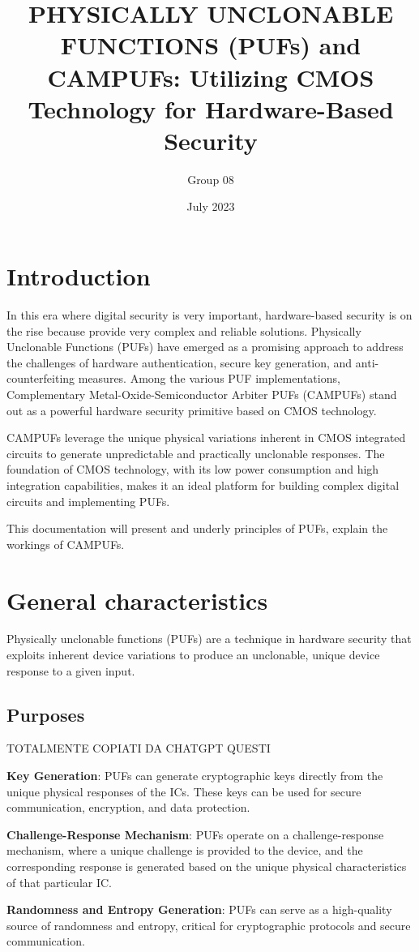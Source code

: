 \documentclass{article}
\title{\textbf{PHYSICALLY UNCLONABLE FUNCTIONS (PUFs) and CAMPUFs: Utilizing CMOS Technology for Hardware-Based Security}}
\author{ Group 08 } %
\date{July 2023}
\begin{document}
\maketitle
\section{Introduction}
In this era where digital security is very important, hardware-based security  is on the rise because provide very complex and reliable solutions. Physically Unclonable Functions (PUFs) have emerged as a promising approach to address the challenges of hardware authentication, secure key generation, and anti-counterfeiting measures. Among the various PUF implementations, Complementary Metal-Oxide-Semiconductor Arbiter PUFs (CAMPUFs) stand out as a powerful hardware security primitive based on CMOS technology.

CAMPUFs leverage the unique physical variations inherent in CMOS integrated circuits to generate unpredictable and practically unclonable responses. The foundation of CMOS technology, with its low power consumption and high integration capabilities, makes it an ideal platform for building complex digital circuits and implementing PUFs.

This documentation will present and underly principles of PUFs, explain the workings of CAMPUFs.
\section{General characteristics}
Physically unclonable functions (PUFs) are a technique in hardware security that exploits inherent device variations to produce an unclonable, unique device response to a given input.
\subsection{Purposes} TOTALMENTE COPIATI DA CHATGPT QUESTI

\textbf{Key Generation}: PUFs can generate cryptographic keys directly from the unique physical responses of the ICs. These keys can be used for secure communication, encryption, and data protection.

\textbf{Challenge-Response Mechanism}: PUFs operate on a challenge-response mechanism, where a unique challenge is provided to the device, and the corresponding response is generated based on the unique physical characteristics of that particular IC.

\textbf{Randomness and Entropy Generation}: PUFs can serve as a high-quality source of randomness and entropy, critical for cryptographic protocols and secure communication.
\end{document}
